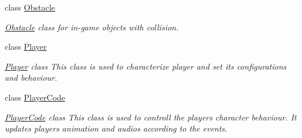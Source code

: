\begin{DoxyCompactItemize}
class \hyperlink{class_azo_1_1_obstacle}{Obstacle}
\begin{DoxyCompactList}\small\item\em \hyperlink{class_azo_1_1_obstacle}{Obstacle} class for in-\/game objects with collision. \end{DoxyCompactList}\item 
class \hyperlink{class_azo_1_1_player}{Player}
\begin{DoxyCompactList}\small\item\em \hyperlink{class_azo_1_1_player}{Player} class This class is used to characterize player and set its configurations and behaviour. \end{DoxyCompactList}\item 
class \hyperlink{class_azo_1_1_player_code}{Player\+Code}
\begin{DoxyCompactList}\small\item\em \hyperlink{class_azo_1_1_player_code}{Player\+Code} class This class is used to controll the player\textquotesingle{}s character behaviour. It updates player\textquotesingle{}s animation and audios according to the events. \end{DoxyCompactList}\end{DoxyCompactItemize}

